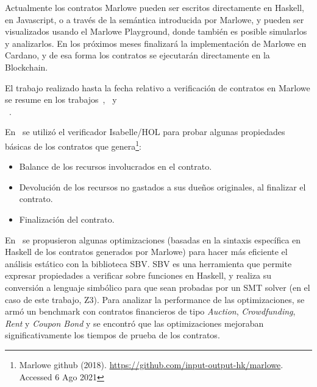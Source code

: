 \documentclass[12pt]{book}
\begin{document}
Actualmente los contratos Marlowe pueden ser escritos directamente en Haskell, en Javascript, o a través de la semántica introducida por Marlowe, y pueden ser visualizados usando el Marlowe Playground, donde también es posible simularlos y analizarlos. En los próximos meses finalizará la implementación de Marlowe en Cardano, y de esa forma los contratos se ejecutarán directamente en la Blockchain.

El trabajo realizado hasta la fecha relativo a verificación de contratos en Marlowe se resume en los trabajos~\cite{10.1007/978-3-030-03427-6_27},~\cite{10.1007/978-3-030-54455-3_35} y \\~\cite{10.1007/978-3-030-61467-6_11}.

 En~\cite{10.1007/978-3-030-54455-3_35} se utilizó el verificador Isabelle/HOL para probar algunas propiedades básicas de los contratos que genera\footnote{Marlowe github (2018). \href{https://github.com/input-output-hk/marlowe}{https://github.com/input-output-hk/marlowe}. Accessed
6 Ago 2021}:
\begin{itemize}
    \item Balance de los recursos involucrados en el contrato.
    \item Devolución de los recursos no gastados a sus dueños originales, al finalizar el contrato.
    \item Finalización del contrato.
\end{itemize}

En~\cite{10.1007/978-3-030-61467-6_11} se propusieron algunas optimizaciones (basadas en la sintaxis específica en Haskell de los contratos generados por Marlowe) para hacer más eficiente el análisis estático con la biblioteca SBV. SBV es una herramienta que permite expresar propiedades a verificar sobre funciones en Haskell, y realiza su conversión a lenguaje simbólico para que sean probadas por un SMT solver (en el caso de este trabajo, Z3). Para analizar la performance de las optimizaciones, se armó un benchmark con contratos financieros de tipo \textit{Auction}, \textit{Crowdfunding}, \textit{Rent} y \textit{Coupon Bond} y se encontró que las optimizaciones mejoraban significativamente los tiempos de prueba de los contratos.
\end{document}
